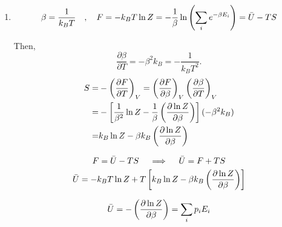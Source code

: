             \begin{enumerate}[label=(\alph*)]
            \item \begin{equation}
                \beta =\frac{1}{k_BT}\quad,\quad F=-k_BT\ln Z =-\frac{1}{\beta}\ln\left(\sum_i e^{-\beta E_i}\right) = \Bar{U} -TS
            \end{equation}
            
            Then,
            \begin{equation}
            \frac{\partial\beta}{\partial T}  = -\beta^2 k_B = -\frac{1}{k_BT^2}.
            \end{equation}
            \begin{align}
                 S =& - \left(\frac{\partial F}{\partial T} \right)_V = \left(\frac{\partial F}{\partial \beta} \right)_V \left(\frac{\partial \beta}{\partial T} \right)_V \notag
                 \\
                 =&-\left[\frac{1}{\beta^2}\ln Z - \frac{1}{\beta} \left(\frac{\partial \ln Z}{\partial \beta} \right) \right] (-\beta^2 k_B)\notag 
                 \\
                 =& k_B \ln Z -\beta k_B \left(\frac{\partial \ln Z}{\partial \beta} \right)
            \end{align}
            
            \begin{equation}
                F=\Bar{U}-TS \quad \implies \quad \Bar{U} = F+TS 
            \end{equation}
            \begin{equation}
            \Bar{U} = -k_BT\ln Z +T\left[k_B \ln Z -\beta k_B \left(\frac{\partial \ln Z}{\partial\beta} \right)\right]
            \end{equation}
            
            \begin{equation}
                \Bar{U} = -\left(\frac{\partial \ln Z}{\partial\beta} \right)=\sum_i p_i E_i
            \end{equation}
            

\end{enumerate}
